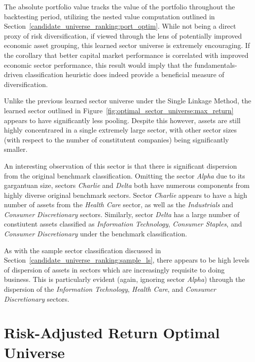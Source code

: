 \documentclass[../main.tex]{subfiles}
\begin{document}
The absolute portfolio value tracks the value of the portfolio throughout the backtesting period, utilizing the nested value computation outlined in Section~\ref{candidate_universe_ranking:port_optim}. While not being a direct proxy of risk diversification, if viewed through the lens of potentially improved economic asset grouping, this learned sector universe is extremely encouraging. If the corollary that better capital market performance is correlated with improved economic sector performance, this result would imply that the fundamentals-driven classification heuristic does indeed provide a beneficial measure of diversification.

Unlike the previous learned sector universe under the Single Linkage Method, the learned sector outlined in Figure~\ref{fig:optimal_sector_universe:max_return} appears to have significantly less pooling. Despite this however, assets are still highly concentrared in a single extremely large sector, with other sector sizes (with respect to the number of constitutent companies) being significantly smaller.

An interesting observation of this sector is that there is significant dispersion from the original benchmark classification. Omitting the sector \textit{Alpha} due to its gargantuan size, sectors \textit{Charlie} and \textit{Delta} both have numerous components from highly diverse original benchmark sectors. Sector \textit{Charlie} appears to have a high number of assets from the \textit{Health Care} sector, as well as the \textit{Industrials} and \textit{Consumer Discretionary} sectors. Similarly, sector \textit{Delta} has a large number of constiutent assets classified as \textit{Information Technology}, \textit{Consumer Staples}, and \textit{Consumer Discretionary} under the benchmark classification.

As with the sample sector classification discussed in Section~\ref{candidate_universe_ranking:sample_ls}, there appears to be high levels of dispersion of assets in sectors which are increasingly requisite to doing business. This is particularly evident (again, ignoring sector \textit{Alpha}) through the dispersion of the \textit{Information Technology}, \textit{Health Care}, and \textit{Consumer Discretionary} sectors.


\section{Risk-Adjusted Return Optimal Universe}
\end{document}
